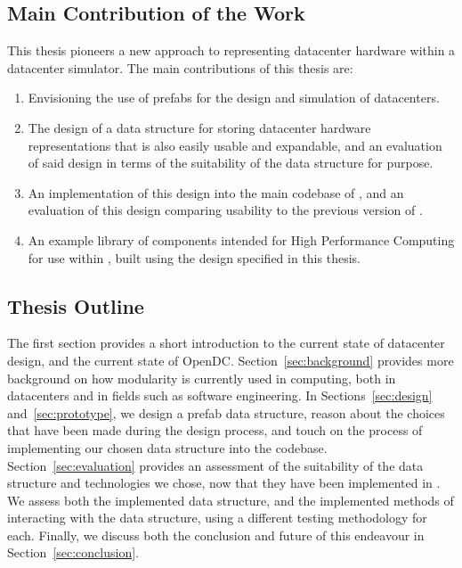 \documentclass[11pt]{article}
\begin{document}
	\subsection{Main Contribution of the Work}
		This thesis pioneers a new approach to representing datacenter hardware within a datacenter simulator.
		The main contributions of this thesis are:
		\begin{enumerate}
			\item Envisioning the use of prefabs for the design and simulation of datacenters.
			\item The design of a data structure for storing datacenter hardware representations that is also easily usable and expandable, and an evaluation of said design in terms of the suitability of the data structure for purpose.
			\item An implementation of this design into the main codebase of \opendc{}, and an evaluation of this design comparing usability to the previous version of \opendc{}.
			\item An example library of components intended for High Performance Computing for use within \opendc{}, built using the design specified in this thesis.
		\end{enumerate}
	
	\subsection{Thesis Outline}
		The first section provides a short introduction to the current state of datacenter design, and the current state of OpenDC. 
		Section~\ref{sec:background} provides more background on how modularity is currently used in computing, both in datacenters and in fields such as software engineering. 
		In Sections~\ref{sec:design} and~\ref{sec:prototype}, we design a prefab data structure, reason about the choices that have been made during the design process, and touch on the process of implementing our chosen data structure into the \opendc{} codebase.
		Section~\ref{sec:evaluation} provides an assessment of the suitability of the data structure and technologies we chose, now that they have been implemented in \opendc{}.
		We assess both the implemented data structure, and the implemented methods of interacting with the data structure, using a different testing methodology for each.
		Finally, we discuss both the conclusion and future of this endeavour in Section~\ref{sec:conclusion}.
	

	

\newpage
\end{document}
